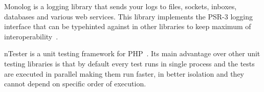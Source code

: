  \label{sec:theory:monolog}

Monolog is a logging library that sends your logs to files, sockets, inboxes, databases and various web services. This library implements the PSR-3 logging interface that can be typehinted against in other libraries to keep maximum of interoperability~\cite{monolog:readme}.

 \label{sec:theory:nette-tester}

\gls{nTester} is a unit testing framework for PHP~\cite{tester:docs}. Its main advantage over other unit testing libraries is that by default every test runs in single process and the tests are executed in parallel making them run faster, in better isolation and they cannot depend on specific order of execution.
